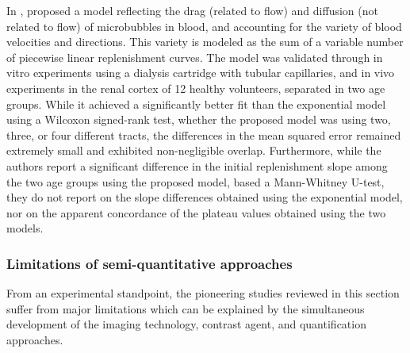 In \citeyear{Quaia:2009fs}, \citet{Quaia:2009fs} proposed a model reflecting the drag (related to flow) and diffusion (not related to flow) of microbubbles in blood, and accounting for the variety of blood velocities and directions. %
This variety is modeled as the sum of a variable number of piecewise linear replenishment curves.
The model was validated through in vitro experiments using a dialysis cartridge with tubular capillaries, and in vivo experiments in the renal cortex of 12 healthy volunteers, separated in two age groups. 
While it achieved a significantly better fit than the exponential model using a Wilcoxon signed-rank test, whether the proposed model was using two, three, or four different tracts, the differences in the mean squared error remained extremely small and exhibited non-negligible overlap.
Furthermore, while the authors report a significant difference in the initial replenishment slope among the two age groups using the proposed model, based a Mann-Whitney U-test, they do not report on the slope differences obtained using the exponential model, nor on the apparent concordance of the plateau values obtained using the two models.

\subsubsection{Limitations of semi-quantitative approaches}

From an experimental standpoint, the pioneering studies reviewed in this section suffer from major limitations which can be explained by the simultaneous development of the imaging technology, contrast agent, and quantification approaches.

